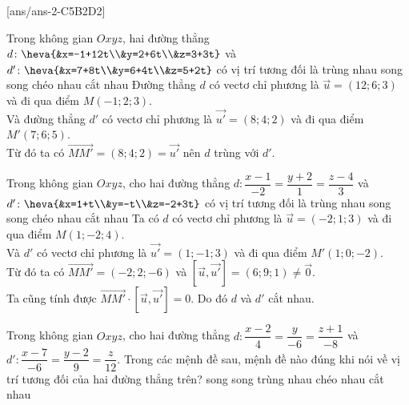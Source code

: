 [ans/ans-2-C5B2D2]
\TN
\begin{ex}%
	Trong không gian $Oxyz$, hai đường thẳng $d \colon \heva{&x=-1+12t\\&y=2+6t\\&z=3+3t}$ và  $d' \colon \heva{&x=7+8t\\&y=6+4t\\&z=5+2t}$ có vị trí tương đối là
	\choice
	{\True trùng nhau}
	{song song}
	{chéo nhau}
	{cắt nhau}
	\loigiai
	{Đường thẳng $d$ có vectơ chỉ phương là  $\overrightarrow{u}=(12;6;3)$ và đi qua điểm $M(-1;2;3)$.\\
		Và đường thẳng $d'$ có vectơ chỉ phương là  $\overrightarrow{u'}=(8;4;2)$ và đi qua điểm $M'(7;6;5)$.\\
		Từ đó ta có $\overrightarrow{MM'}=(8;4;2)=\overrightarrow{u'}$ nên $d$ trùng với $d'$.}
\end{ex}
\begin{ex}%
	Trong không gian $Oxyz$, cho hai đường thẳng $d \colon \dfrac{x-1}{-2}=\dfrac{y+2}{1}=\dfrac{z-4}{3}$ và  $ d' \colon \heva{&x=1+t\\&y=-t\\&z=-2+3t}$ có vị trí tương đối là
	\choice
	{trùng nhau}
	{song song}
	{chéo nhau}
	{\True  cắt nhau}
	\loigiai
	{Ta có 	$d$ có vectơ chỉ phương là  $\overrightarrow{u}=(-2;1;3)$ và đi qua điểm $M(1;-2;4)$.\\
		Và $d'$ có vectơ chỉ phương là  $\overrightarrow{u'}=(1;-1;3)$ và đi qua điểm $M'(1;0;-2)$.\\
		Từ đó ta có $\overrightarrow{MM'}=(-2;2;-6)$ và $ \left[\overrightarrow{u},\overrightarrow{u'} \right]=(6;9;1)\ne \overrightarrow{0}$. \\
		Ta cũng tính được $ \overrightarrow{MM'} \cdot \left[\overrightarrow{u},\overrightarrow{u'} \right]=0$. Do đó $d$ và $d'$ cắt nhau.}
\end{ex}
\begin{ex}%
	Trong không gian $Oxyz$, cho hai đường thẳng $d\colon \dfrac{x-2}{4}=\dfrac{y}{-6}=\dfrac{z+1}{-8}$ và $d'\colon \dfrac{x-7}{-6}=\dfrac{y-2}{9}=\dfrac{z}{12}$. Trong các mệnh đề sau, mệnh đề nào đúng khi nói về vị trí tương đối của hai đường thẳng trên?
	\choice
	{\True song song}
	{trùng nhau}
	c{héo nhau}
	{cắt nhau}
\end{ex}
